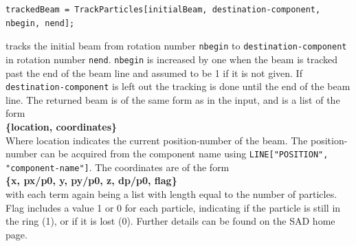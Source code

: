 \documentclass{article}
\begin{document}
\begin{lstlisting}
trackedBeam = TrackParticles[initialBeam, destination-component, nbegin, nend];
\end{lstlisting}
tracks the initial beam from rotation number \texttt{nbegin} to \texttt{destination-component} in rotation number \texttt{nend}. \texttt{nbegin} is increased by one when the beam is tracked past the end of the beam line and assumed to be 1 if it is not given. If \texttt{destination-component} is left out the tracking is done until the end of the beam line. The returned beam is of the same form as in the input, and is a list of the form
\\
\textbf{\{location, coordinates\}}
\\
Where location indicates the current position-number of the beam. The position-number can be acquired from the component name using \texttt{LINE["POSITION", "component-name"]}. The coordinates are of the form 
\\
\textbf{\{x, px/p0, y, py/p0, z, dp/p0, flag\}}
\\
with each term again being a list with length equal to the number of particles. Flag includes a value 1 or 0 for each particle, indicating if the particle is still in the ring (1), or if it is lost (0).
Further details can be found on the SAD home page.
\end{document}
